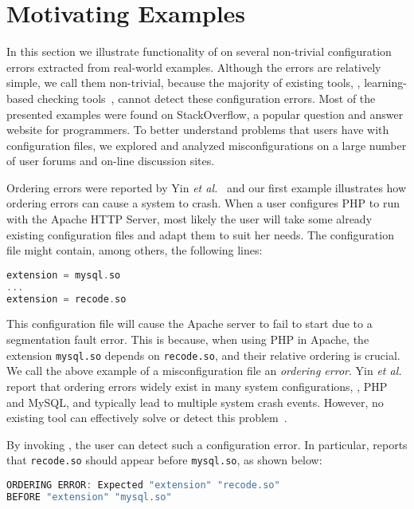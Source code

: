 \section{Motivating Examples}
\label{sec-motiv}

In this section we illustrate functionality of \app on several non-trivial configuration errors
extracted from real-world examples. Although the errors are relatively simple, we call them 
non-trivial, because the majority of existing tools, \eg, learning-based checking
tools~\cite{zhang14encore, wang04automatic}, cannot detect
these configuration errors. Most of the presented examples were found on StackOverflow,
a popular question and answer website for programmers. To better understand problems that users have with 
configuration files, we explored and analyzed misconfigurations on a large number of user forums and on-line discussion sites.

Ordering errors were reported by Yin {\em et al.}~\cite{yin11anempirical} and our first
example illustrates how ordering errors can cause a system to crash. When a user configures PHP 
to run with the
Apache HTTP Server, most likely the user will take some already existing configuration files and adapt them
to suit her needs. The configuration file might contain, among others, 
the following lines:
\begin{lstlisting}[language=C, xleftmargin=.01\textwidth]
extension = mysql.so
...
extension = recode.so
\end{lstlisting} 

This configuration file will cause the Apache server to 
fail to start due to a segmentation fault error. 
This is because, when using PHP in Apache, the extension {\tt mysql.so} 
depends on {\tt recode.so}, and their relative ordering
is crucial. 
We call the above example of a misconfiguration file
an {\em ordering error}.
Yin {\em et al.} report that ordering errors widely exist in
many system configurations, \eg, PHP and MySQL,
and typically lead to multiple system crash events.
However, no existing tool can effectively solve 
or detect this problem~\cite{zhang14encore, xu15systems, xu13do}.

By invoking \app, the user can detect such a configuration error.
In particular, \app reports that {\tt recode.so} 
should appear before {\tt mysql.so}, as shown
below:

\begin{lstlisting}[language=C, xleftmargin=.01\textwidth]
ORDERING ERROR: Expected "extension" "recode.so"
BEFORE "extension" "mysql.so"
\end{lstlisting} 


